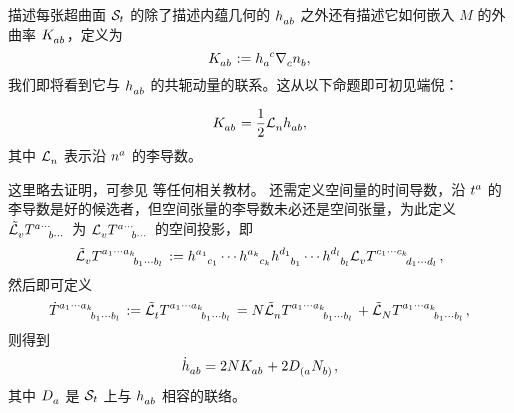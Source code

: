 		描述每张超曲面 $\mathcal{S}_t$ 的除了描述内蕴几何的 $\tensor{h}{_a_b}$ 之外还有描述它如何嵌入 $M$ 的外曲率 $\tensor{K}{_a_b}$，定义为
		\begin{equation}
			\tensor{K}{_a_b} \definedby \tensor{h}{_a^c} \Nabla{c} \tensor{n}{_b},
		\end{equation}
		我们即将看到它与 $\tensor{h}{_a_b}$ 的共轭动量的联系。这从以下命题即可初见端倪：
		\begin{Property}
			\begin{equation}
				\tensor{K}{_a_b} = \frac{1}{2} \Ld{n} \tensor{h}{_a_b},
			\end{equation}
			其中 $\Ld{n}$ 表示沿 $\tensor{n}{^a}$ 的李导数。
		\end{Property}
		这里略去证明，可参见 等任何相关教材。%
		还需定义空间量的时间导数，沿 $\tensor{t}{^a}$ 的李导数是好的候选者，但空间张量的李导数未必还是空间张量，为此定义 $\spaceLd{v} \tensor{T}{^{a\cdots}_{b \cdots}}$ 为 $\Ld{v} \tensor{T}{^{a\cdots}_{b \cdots}}$ 的空间投影，即
		\begin{equation}
			\spaceLd{v} \tensor{T}{^{a_1 \cdots a_k}_{b_1 \cdots b_l}} \definedby \tensor{h}{^{a_1}_{c_1}} \cdots \tensor{h}{^{a_k}_{c_k}} \tensor{h}{^{d_1}_{b_1}} \cdots \tensor{h}{^{d_l}_{b_l}} \Ld{v} \tensor{T}{^{c_1 \cdots c_k}_{d_1 \cdots d_l}}, \label{eq-spaceLd}
		\end{equation}
		然后即可定义
		\begin{equation}
			\tensor{\dot{T}}{^{a_1 \cdots a_k}_{b_1 \cdots b_l}} \definedby \spaceLd{t} \tensor{T}{^{a_1 \cdots a_k}_{b_1 \cdots b_l}} = N \spaceLd{n} \tensor{T}{^{a_1 \cdots a_k}_{b_1 \cdots b_l}} + \spaceLd{N} \tensor{T}{^{a_1 \cdots a_k}_{b_1 \cdots b_l}}, \label{eq-timedot}
		\end{equation}
		则得到
		\begin{equation}
			\tensor{\dot{h}}{_a_b} = 2N \tensor{K}{_a_b} + 2 \spaceD{{(a}} \tensor{N}{_{b)}},
		\end{equation}
		其中 $\spaceD{a}$ 是 $\mathcal{S}_t$ 上与 $\tensor{h}{_a_b}$ 相容的联络。



